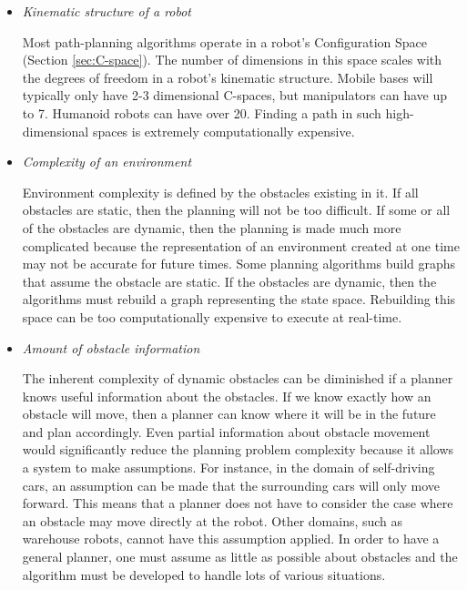 \documentclass[10pt,conference]{ieeeconf}
\begin{document}
	\begin{itemize}
	\item \emph{Kinematic structure of a robot}
	
	Most path-planning algorithms operate in a robot's Configuration Space (Section \ref{sec:C-space}). The number of dimensions in this space scales with the degrees of freedom in a robot's kinematic structure. Mobile bases will typically only have 2-3 dimensional C-spaces, but manipulators can have up to 7. Humanoid robots can have over 20. Finding a path in such high-dimensional spaces is extremely computationally expensive. 
	
	\item \emph{Complexity of an environment}
	
	Environment complexity is defined by the obstacles existing in it. If all obstacles are static, then the planning will not be too difficult. If some or all of the obstacles are dynamic, then the planning is made much more complicated because the representation of an environment created at one time may not be accurate for future times. Some planning algorithms build graphs that assume the obstacle are static. If the obstacles are dynamic, then the algorithms must rebuild a graph representing the state space. Rebuilding this space can be too computationally expensive to execute at real-time. 
	
	
	\item \emph{Amount of obstacle information}
	
	The inherent complexity of dynamic obstacles can be diminished if a planner knows useful information about the obstacles. If we know exactly how an obstacle will move, then a planner can know where it will be in the future and plan accordingly. Even partial information about obstacle movement would significantly reduce the planning problem complexity because it allows a system to make assumptions. For instance, in the domain of self-driving cars, an assumption can be made that the surrounding cars will only move forward. This means that a planner does not have to consider the case where an obstacle may move directly at the robot. Other domains, such as warehouse robots, cannot have this assumption applied. In order to have a general planner, one must assume as little as possible about obstacles and the algorithm must be developed to handle lots of various situations.
	

	
	\end{itemize}
	
\end{document}
